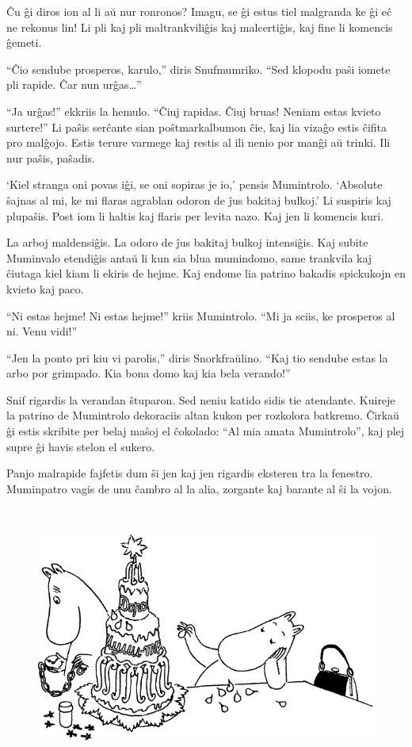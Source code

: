 Ĉu ĝi diros ion al li aŭ nur ronronos? Imagu, se ĝi estus tiel malgranda ke ĝi eĉ ne rekonus lin! Li pli kaj pli maltrankviliĝis kaj malcertiĝis, kaj fine li komencis ĝemeti.

``Ĉio sendube prosperos, karulo,'' diris Snufmumriko. ``Sed klopodu paŝi iomete pli rapide. Ĉar nun urĝas{\ldots}''

``Ja urĝas!'' ekkriis la hemulo. ``Ĉiuj rapidas. Ĉiuj bruas! Neniam estas kvieto surtere!'' Li paŝis serĉante sian poŝtmarkalbumon ĉie, kaj lia vizaĝo estis ĉifita pro malĝojo. Estis terure varmege kaj restis al ili nenio por manĝi aŭ trinki. Ili nur paŝis, paŝadis.

`Kiel stranga oni povas iĝi, se oni sopiras je io,' pensis Mumintrolo. `Absolute ŝajnas al mi, ke mi flaras agrablan odoron de ĵus bakitaj bulkoj.' Li suspiris kaj plupaŝis. Post iom li haltis kaj flaris per levita nazo. Kaj jen li komencis kuri.

La arboj maldensiĝis. La odoro de ĵus bakitaj bulkoj intensiĝis. Kaj subite Muminvalo etendiĝis antaŭ li kun sia blua mumindomo, same trankvila kaj ĉiutaga kiel kiam li ekiris de hejme. Kaj endome lia patrino bakadis spickukojn en kvieto kaj paco.

``Ni estas hejme! Ni estas hejme!'' kriis Mumintrolo. ``Mi ja sciis, ke prosperos al ni. Venu vidi!''

``Jen la ponto pri kiu vi parolis,'' diris Snorkfraŭlino. ``Kaj tio sendube estas la arbo por grimpado. Kia bona domo kaj kia bela verando!''

Snif rigardis la verandan ŝtuparon. Sed neniu katido sidis tie atendante.
\sectionbreak
Kuireje la patrino de Mumintrolo dekoraciis altan kukon per rozkolora batkremo. Ĉirkaŭ ĝi estis skribite per belaj maŝoj el ĉokolado: ``Al mia amata Mumintrolo'', kaj plej supre ĝi havis stelon el sukero.

Panjo malrapide fajfetis dum ŝi jen kaj jen rigardis eksteren tra la fenestro. Muminpatro vagis de unu ĉambro al la alia, zorgante kaj barante al ŝi la vojon.

\begin{figure}[htbp]
\centering
\includegraphics[width=400pt,height=245pt]{9-1.png}
\caption{}
\label{9-1}
\end{figure}


